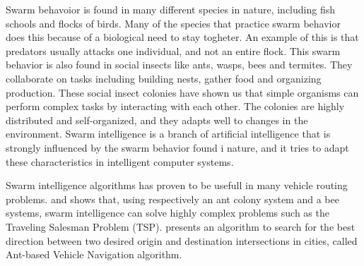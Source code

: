 
Swarm behavoior is found in many different species in nature, including fish schools and flocks of birds. Many of the species that practice swarm behavior does this because of a biological need to stay togheter. An example of this is that predators usually attacks one individual, and not an entire flock. This swarm behavior is also found in social insects like ants, wasps, bees and termites. They collaborate on tasks including building nests, gather food and organizing production. These social insect colonies have shown us that simple organisms can perform complex tasks by interacting with each other. The colonies are highly distributed and self-organized, and they adapts well to changes in the environment. Swarm intelligence \citep{swarmintelligence} is a branch of artificial intelligence that is strongly influenced by the swarm behavior found i nature, and it tries to adapt these characteristics in intelligent computer systems. 

Swarm intelligence algorithms has proven to be usefull in many vehicle routing problems. \citet{acs:tsp1} and \citet{bs:tsp1} shows that, using respectively an ant colony system and a bee systems, swarm intelligence can solve highly complex problems such as the Traveling Salesman Problem (TSP). \citet{ant-vehicleNavigation} presents an algorithm to search for the best direction between two desired origin and destination intersections in cities, called Ant-based Vehicle Navigation algorithm.